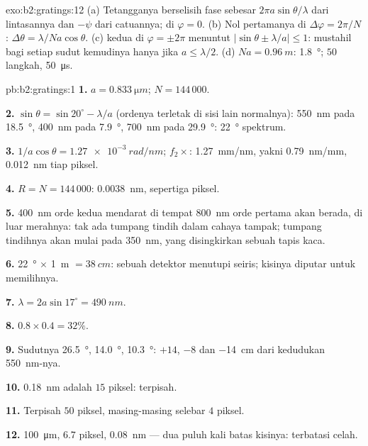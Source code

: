 \begin{solution}{exo:b2:gratings:12}
(a) Tetangganya berselisih fase sebesar $2\pi a\sin\theta/\lambda$ dari lintasannya dan $-\psi$
dari catuannya;  di $\varphi = 0$. (b) Nol pertamanya di
$\Delta\varphi = 2\pi/N$: $\Delta\theta = \lambda/Na\cos\theta$. (c)  kedua di
$\varphi = \pm2\pi$ menuntut $|\sin\theta \pm \lambda/a| \le 1$: mustahil bagi setiap sudut
kemudinya hanya jika $a \le \lambda/2$. (d) $Na = \qty{0.96}{m}$: \qty{1.8}{\degree}; $50$ langkah,
\qty{50}{\micro s}.
\end{solution}

\begin{solution}{pb:b2:gratings:1}
\textbf{1.} $a = \qty{0.833}{\micro m}$; $N = 144\,000$.

\textbf{2.} $\sin\theta = \sin20^\circ - \lambda/a$ (ordenya terletak di sisi lain
normalnya): \qty{550}{nm} pada \qty{18.5}{\degree}, \qty{400}{nm} pada \qty{7.9}{\degree}, \qty{700}{nm} pada
\qty{29.9}{\degree}: \qty{22}{\degree} spektrum.

\textbf{3.} $1/a\cos\theta = \qty{1.27e-3}{rad/nm}$; $f_2\times$: \qty{1.27}{mm/nm}, yakni
\qty{0.79}{nm/mm}, \qty{0.012}{nm} tiap piksel.

\textbf{4.} $R = N = 144\,000$: \qty{0.0038}{nm}, sepertiga piksel.

\textbf{5.} \qty{400}{nm} orde kedua mendarat di tempat \qty{800}{nm} orde pertama
akan berada, di luar merahnya: tak ada tumpang tindih dalam cahaya tampak; tumpang tindihnya akan
mulai pada \qty{350}{nm}, yang disingkirkan sebuah tapis kaca.

\textbf{6.} \qty{22}{\degree} $\times$ \qty{1}{m} $= \qty{38}{cm}$: sebuah detektor menutupi seiris;
kisinya diputar untuk memilihnya.

\textbf{7.} $\lambda = 2a\sin17^\circ = \qty{490}{nm}$.

\textbf{8.} $0.8 \times 0.4 = 32\%$.

\textbf{9.} Sudutnya \qty{26.5}{\degree}, \qty{14.0}{\degree}, \qty{10.3}{\degree}: $+14$, $-8$ dan
\qty{-14}{cm} dari kedudukan \qty{550}{nm}-nya.

\textbf{10.} \qty{0.18}{nm} adalah $15$ piksel: terpisah.

\textbf{11.} Terpisah $50$ piksel, masing-masing selebar $4$ piksel.

\textbf{12.} \qty{100}{\micro m}, $6.7$ piksel, \qty{0.08}{nm} --- dua puluh kali
batas kisinya: terbatasi celah.


\end{solution}

